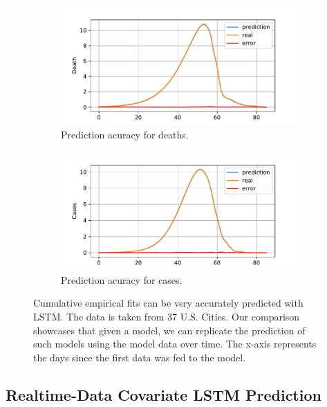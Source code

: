 \documentclass[a4paper, inpress]{jds} %
\renewcommand{\_}{%
    \textunderscore\hspace{0pt}%
}
\begin{document}
\begin{figure}[!h]
    \centering

    \begin{subfigure}{.49\textwidth}
      \centering
      \includegraphics[width=1.0\linewidth]{images/predict/Fig4a.pdf}  
      \caption{Prediction acuracy for deaths.}
      \label{fig:magic-a}
    \end{subfigure}
    \begin{subfigure}{0.49\textwidth}
      \centering
      \includegraphics[width=1.0\linewidth]{images/predict/Fig4b.pdf}        
      \caption{Prediction acuracy for cases.}
      \label{fig:magic-b}
    \end{subfigure}

    \caption{Cumulative empirical fits can be very accurately
      predicted with LSTM. The data is taken from 37 U.S. Cities. Our
      comparison showcases that given a model, we can replicate the
      prediction of such models using the model data over time. The
      x-axis represents the days since the first data was fed to the
      model.}
    \label{fig:magic-1}
\end{figure}




\subsection{Realtime-Data Covariate LSTM Prediction}
\label{sec:lstm-covariate}
\end{document}
